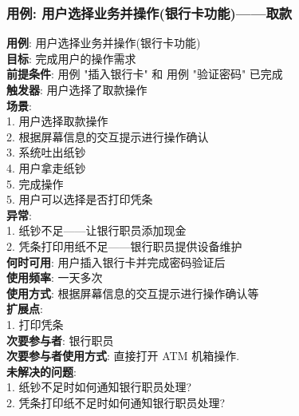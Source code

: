 \documentclass[UTF8]{article}
\begin{document}
\subsubsection{用例: 用户选择业务并操作(银行卡功能)——取款}
\noindent
\textbf{用例}: 用户选择业务并操作(银行卡功能)
\\
\textbf{目标}: 完成用户的操作需求
\\
\textbf{前提条件}: 用例 "插入银行卡" 和 用例 "验证密码" 已完成
\\
\textbf{触发器}: 用户选择了取款操作
\\
\textbf{场景}: \\
	\hspace*{2em}1. 用户选择取款操作 \\
	\hspace*{2em}2. 根据屏幕信息的交互提示进行操作确认 \\
	\hspace*{2em}3. 系统吐出纸钞 \\
	\hspace*{2em}4. 用户拿走纸钞 \\
	\hspace*{2em}5. 完成操作 \\
	\hspace*{2em} 5. 用户可以选择是否打印凭条 \\
\textbf{异常}: \\
	\hspace*{2em} 1. 纸钞不足——让银行职员添加现金 \\
	\hspace*{2em} 2. 凭条打印用纸不足——银行职员提供设备维护 \\
\textbf{何时可用}: 用户插入银行卡并完成密码验证后
\\
\textbf{使用频率}: 一天多次
\\
\textbf{使用方式}: 根据屏幕信息的交互提示进行操作确认等
\\
\textbf{扩展点}: \\
	\hspace*{2em}1. 打印凭条 \\
\textbf{次要参与者}: 银行职员
\\
\textbf{次要参与者使用方式}: 直接打开 ATM 机箱操作.
\\
\textbf{未解决的问题}: \\
	\hspace*{2em} 1. 纸钞不足时如何通知银行职员处理? \\
	\hspace*{2em} 2. 凭条打印纸不足时如何通知银行职员处理? \\
		
\end{document}
